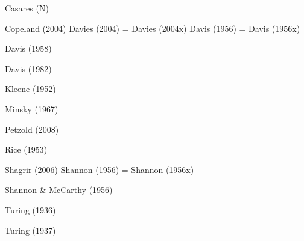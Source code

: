 \vfill\break


\vfill\break

\item Casares (N)
\item Copeland (2004)
\xitem Davies (2004) = Davies (2004x)
\xitem Davis (1956) = Davis (1956x)
\item Davis (1958)
\item Davis (1982)
\item Kleene (1952)
\item Minsky (1967)
\item Petzold (2008)
\item Rice (1953)
\item Shagrir (2006)
\xitem Shannon (1956) = Shannon (1956x)
\item Shannon \& McCarthy (1956)
\item Turing (1936)
\item Turing (1937)
\endreferences


\bye
